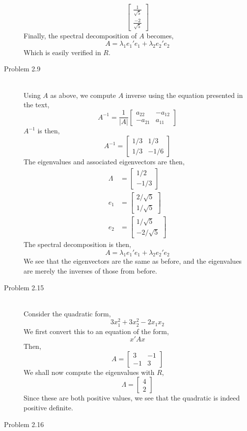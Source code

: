 \documentclass[letterpaper,10pt]{article}
\begin{document}
\begin{description}
\[\begin{bmatrix}
\frac{1}{\sqrt{5}}\\\frac{-2}{\sqrt{5}}
\end{bmatrix} \]
Finally, the spectral decomposition of $A$ becomes,
\[A=\lambda_1e_1'e_1+\lambda_2e_2'e_2\]
Which is easily verified in $R$.
\item[Problem 2.9]\hfill\\
Using $A$ as above, we compute $A$ inverse using the equation presented in the text,
\[A^{-1}=\frac{1}{|A|}\begin{bmatrix}
a_{22} & -a_{12}\\ -a_{21} & a_{11}
\end{bmatrix} \]
$A^{-1}$ is then,
\[A^{-1}=\begin{bmatrix}
1/3 & 1/3\\1/3 & -1/6
\end{bmatrix}\]
The eigenvalues and associated eigenvectors are then,
\begin{align*}
\Lambda &= \begin{bmatrix}
1/2 \\ -1/3
\end{bmatrix}\\
e_1 &= \begin{bmatrix}
2/\sqrt{5} \\ 1/\sqrt{5}
\end{bmatrix}\\
e_2 &= \begin{bmatrix}
1/\sqrt{5}\\-2/\sqrt{5}
\end{bmatrix}
\end{align*}
The spectral decomposition is then,
\[A=\lambda_1e_1'e_1+\lambda_2e_2'e_2\]
We see that the eigenvectors are the same as before, and the eigenvalues are merely the inverses of those from before.
\item[Problem 2.15]\hfill\\
Consider the quadratic form,
\[3x_1^2+3x_2^2-2x_1x_2\]
We first convert this to an equation of the form,
\[x'Ax\]
Then,
\[A=\begin{bmatrix}
3 & -1\\-1 & 3
\end{bmatrix}\]
We shall now compute the eigenvalues with $R$,
\[\Lambda=\begin{bmatrix}
4 \\ 2
\end{bmatrix} \]
Since these are both positive values, we see that the quadratic is indeed positive definite.
\item[Problem 2.16]\hfill\\

\end{description}
\end{document}
